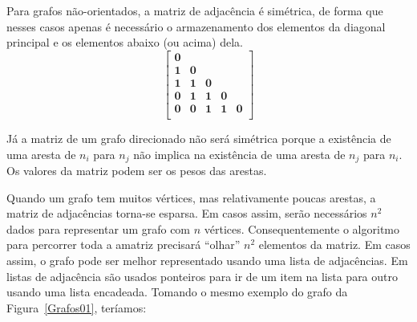 \documentclass[11pt,fleqn]{book} %
\begin{document}
Para grafos não-orientados, a matriz de adjacência é simétrica, de forma que nesses casos apenas é necessário o armazenamento dos elementos da diagonal principal e os elementos abaixo (ou acima) dela.
$$\begin{bmatrix}
\textbf{0} & ~ & ~ & ~ & ~ \\
\textbf{1} & \textbf{0} & ~ & ~ & ~ \\
\textbf{1} & \textbf{1} & \textbf{0} & ~ & ~ \\
\textbf{0} & \textbf{1} & \textbf{1} & \textbf{0} & ~ \\
\textbf{0} & \textbf{0} & \textbf{1} & \textbf{1} & \textbf{0} \\
\end{bmatrix}$$

Já a matriz de um grafo direcionado não será simétrica porque a existência de uma aresta de $n_i$ para $n_j$ não implica na existência de uma aresta de $n_j$ para $n_i$.
Os valores da matriz podem ser os pesos das arestas.

Quando um grafo tem muitos vértices, mas relativamente poucas arestas, a matriz de adjacências torna-se esparsa.
Em casos assim, serão necessários $n^2$ dados para representar um grafo com $n$ vértices.
Consequentemente o algoritmo para percorrer toda a amatriz precisará ``olhar'' $n^2$ elementos da matriz.
Em casos assim, o grafo pode ser melhor representado usando uma lista de adjacências.
Em listas de adjacência são usados ponteiros para ir de um item na lista para outro usando uma lista encadeada.
Tomando o mesmo exemplo do grafo da Figura~\ref{Grafos01}, teríamos:
\usetikzlibrary{positioning}

\def\LinkedList#1{%
  \foreach \element in \list {
     \node[node of list, right = of aux, name=ele] {\element};
     \draw[link] (aux) -- (ele);
     \coordinate (aux) at (ele.east);
  } 
}

\begin{center}
\end{center}
\end{document}
